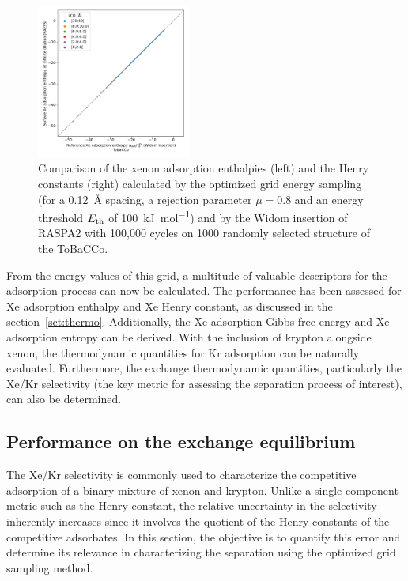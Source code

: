 \documentclass[main]{subfiles}
\begin{document}
\begin{figure}[ht]
  \centering
    \includegraphics[width=0.45\textwidth]{figures/3-fastsim/H_Xe_0_widom_vs_Enthalpy_grid_kjmol_overview_tobacco.jpeg}
    \caption{Comparison of the xenon adsorption enthalpies (left) and the Henry constants (right) calculated by the optimized grid energy sampling (for a \SI{0.12}{\angstrom} spacing, a rejection parameter $\mu=0.8$ and an energy threshold $E_{\text{th}}$ of \SI{100}{\kilo\joule\per\mole}) and by the Widom insertion of RASPA2 with 100,000 cycles on 1000 randomly selected structure of the ToBaCCo.\autocite{Colon_2017} }\label{fgr:grid_tobacco}
\end{figure}

From the energy values of this grid, a multitude of valuable descriptors for the adsorption process can now be calculated. The performance has been assessed for Xe adsorption enthalpy and Xe Henry constant, as discussed in the section~\ref{sct:thermo}. Additionally, the Xe adsorption Gibbs free energy and Xe adsorption entropy can be derived. With the inclusion of krypton alongside xenon, the thermodynamic quantities for Kr adsorption can be naturally evaluated. Furthermore, the exchange thermodynamic quantities, particularly the Xe/Kr selectivity (the key metric for assessing the separation process of interest), can also be determined.


\subsection{Performance on the exchange equilibrium}

The Xe/Kr selectivity is commonly used to characterize the competitive adsorption of a binary mixture of xenon and krypton. Unlike a single-component metric such as the Henry constant, the relative uncertainty in the selectivity inherently increases since it involves the quotient of the Henry constants of the competitive adsorbates. In this section, the objective is to quantify this error and determine its relevance in characterizing the separation using the optimized grid sampling method.
\end{document}
